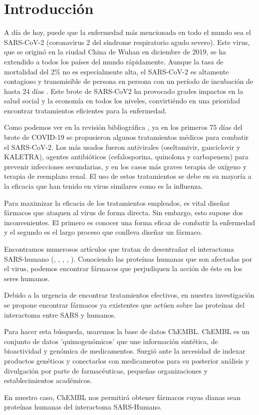 \section{Introducción}
A día de hoy, puede que la enfermedad más mencionada en todo el mundo sea el SARS-CoV-2 (coronavirus 2 del síndrome respiratorio agudo severo). Este virus, que se originó en la ciudad China de Wuhan en diciembre de 2019, se ha extendido a todos los países del mundo rápidamente. Aunque la tasa de mortalidad del 2\% no es especialmente alta, el SARS-CoV-2 es altamente contagioso y transmisible de persona en persona con un período de incubación de hasta 24 días \cite{Yan2020}. Este brote de SARS-CoV2 ha provocado grades impactos en la salud social y la economía en todos los niveles, convirtiéndo en una prioridad encontrar tratamientos eficientes para la enfermedad. 

Como podemos ver en la revisión bibliográfica \cite{Yan2020}, ya en los primeros 75 días del brote de COVID-19 se propusieron algunos tratamientos médicos para combatir el SARS-CoV-2. Los más usados fueron antivirales (oseltamivir, ganciclovir y KALETRA), agentes antibióticos (cefalosporina, quinolona y carbapenem) para prevenir infecciones secundarias, y en los casos más graves terapia de oxígeno y terapia de reemplazo renal. El uso de estos tratamientos se debe en su mayoría a la eficacia que han tenido en virus similares como es la influenza. 

Para maximizar la eficacia de los tratamientos empleados, es vital diseñar fármacos que ataquen al virus de forma directa. Sin embargo, esto supone dos inconvenientes. El primero es conocer una forma eficaz de combatir la enfermedad y el segundo es el largo proceso que conlleva diseñar un fármaco. 

Encontramos numerosos artículos que tratan de desentrañar el interactoma SARS-humano (\cite{Hoffmann2020}, \cite{Yan2020a}, \cite{Shulla2011}, \cite{Chan2020}, \cite{Gysi2020}). Conociendo las proteínas humanas que son afectadas por el virus, podemos encontrar fármacos que perjudiquen la acción de éste en los seres humanos. 

Debido a la urgencia de encontrar tratamientos efectivos, en nuestra investigación se propone encontrar fármacos ya existentes que actúen sobre las proteínas del interactoma entre SARS y humanos. 

Para hacer esta búsqueda, usaremos la base de datos ChEMBL. ChEMBL es un conjunto de datos 'quimogenómicos' que une información sintética, de bioactividad y genómica de medicamentos. Surgió ante la necesidad de indexar productos genéticos y conectarlos con medicamentos para su posterior análisis y divulgación por parte de farmacéuticas, pequeñas organizaciones y establecimientos académicos. 

En nuestro caso, ChEMBL nos permitirá obtener fármacos cuyas dianas sean proteínas humanas del interactoma SARS-Humano.

\newpage